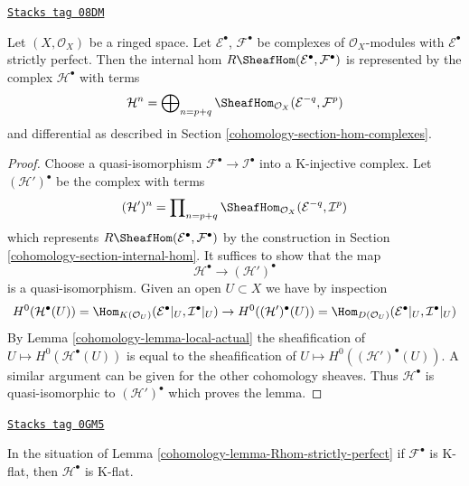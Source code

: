 \begin{lemma}
\label{cohomology-lemma-Rhom-strictly-perfect}
\href{https://stacks.math.columbia.edu/tag/08DM}{\texttt{Stacks tag 08DM}}

Let $(X, \mathcal{O}_X)$ be a ringed space.
Let $\mathcal{E}^\bullet$, $\mathcal{F}^\bullet$ be complexes
of $\mathcal{O}_X$-modules with $\mathcal{E}^\bullet$ strictly perfect.
Then the internal hom $R\SheafHom(\mathcal{E}^\bullet, \mathcal{F}^\bullet)$
is represented by the complex $\mathcal{H}^\bullet$ with terms
$$
\mathcal{H}^n =
\bigoplus\nolimits_{n = p + q}
\SheafHom_{\mathcal{O}_X}(\mathcal{E}^{-q}, \mathcal{F}^p)
$$
and differential as described in Section \ref{cohomology-section-hom-complexes}.
\end{lemma}

\begin{proof}

Choose a quasi-isomorphism $\mathcal{F}^\bullet \to \mathcal{I}^\bullet$
into a K-injective complex. Let $(\mathcal{H}')^\bullet$ be the
complex with terms
$$
(\mathcal{H}')^n =
\prod\nolimits_{n = p + q}
\SheafHom_{\mathcal{O}_X}(\mathcal{E}^{-q}, \mathcal{I}^p)
$$
which represents $R\SheafHom(\mathcal{E}^\bullet, \mathcal{F}^\bullet)$
by the construction in Section \ref{cohomology-section-internal-hom}. It suffices
to show that the map
$$
\mathcal{H}^\bullet \longrightarrow (\mathcal{H}')^\bullet
$$
is a quasi-isomorphism. Given an open $U \subset X$ we have
by inspection
$$
H^0(\mathcal{H}^\bullet(U)) =
\Hom_{K(\mathcal{O}_U)}(\mathcal{E}^\bullet|_U, \mathcal{I}^\bullet|_U)
\to
H^0((\mathcal{H}')^\bullet(U)) =
\Hom_{D(\mathcal{O}_U)}(\mathcal{E}^\bullet|_U, \mathcal{I}^\bullet|_U)
$$
By Lemma \ref{cohomology-lemma-local-actual} the sheafification of
$U \mapsto H^0(\mathcal{H}^\bullet(U))$
is equal to the sheafification of
$U \mapsto H^0((\mathcal{H}')^\bullet(U))$. A similar argument can be
given for the other cohomology sheaves. Thus $\mathcal{H}^\bullet$
is quasi-isomorphic to $(\mathcal{H}')^\bullet$ which proves the lemma.
\end{proof}

\begin{lemma}
\label{cohomology-lemma-Rhom-strictly-perfect-K-flat}
\href{https://stacks.math.columbia.edu/tag/0GM5}{\texttt{Stacks tag 0GM5}}

In the situation of Lemma \ref{cohomology-lemma-Rhom-strictly-perfect}
if $\mathcal{F}^\bullet$ is K-flat, then $\mathcal{H}^\bullet$ is K-flat.
\end{lemma}

